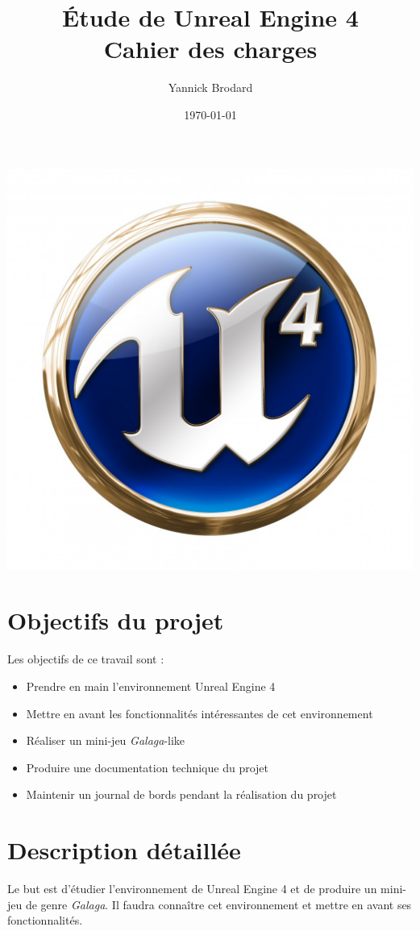 \documentclass[11pt, a4paper]{article}
\title{
\Huge{Étude de Unreal Engine 4} \\[0.5cm]
\LARGE{Cahier des charges}
}
\author{Yannick Brodard}
\date{\today}
\begin{document}
\maketitle
\begin{center}
    \includegraphics[scale=0.4]{UE4_logo}
\end{center}
\thispagestyle{empty}
\newpage
\section{Objectifs du projet}
Les objectifs de ce travail sont :
\begin{itemize}
\item Prendre en main l'environnement Unreal Engine 4
\item Mettre en avant les fonctionnalités intéressantes de cet environnement
\item Réaliser un mini-jeu \textit{Galaga}-like
\item Produire une documentation technique du projet
\item Maintenir un journal de bords pendant la réalisation du projet
\end{itemize}
\section{Description détaillée}
Le but est d'étudier l'environnement de Unreal Engine 4 et de produire un mini-jeu de genre \textit{Galaga}. Il faudra connaître cet environnement et mettre en avant ses fonctionnalités.
\end{document}
